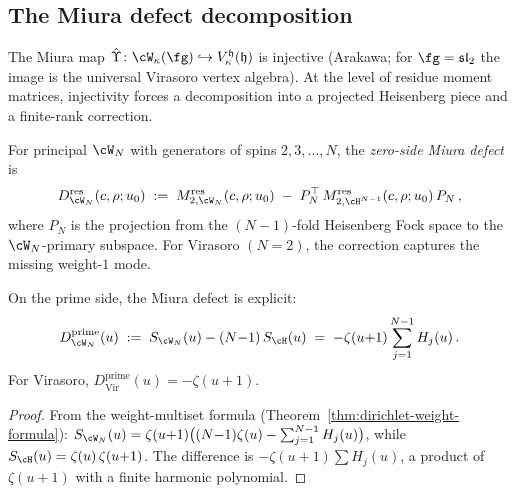 \subsection{The Miura defect decomposition}%
\label{sec:miura-defect-decomposition}%
%

The Miura map $\hat\Upsilon\colon \cW_\kappa(\fg) \hookrightarrow
V^{\mathfrak{h}}_\kappa(\mathfrak{h})$ is injective (Arakawa; for $\fg = \mathfrak{sl}_2$
the image is the universal Virasoro vertex algebra).
At the level of residue moment matrices, injectivity forces a
decomposition into a projected Heisenberg piece and a finite-rank
correction.

\begin{definition}%
\label{def:zero-side-miura-defect}%
%
For principal $\cW_N$ with generators of spins $2,3,\ldots,N$,
the \emph{zero-side Miura defect} is
\begin{equation}\label{eq:zero-side-miura-defect}
D_{\cW_N}^{\mathrm{res}}(c,\rho;u_0)
\;:=\;
M_{2,\cW_N}^{\mathrm{res}}(c,\rho;u_0)
\;-\;
P_N^\top\,
M_{2,\cH^{N-1}}^{\mathrm{res}}(c,\rho;u_0)\,
P_N\,,
\end{equation}
where $P_N$ is the projection from the $(N{-}1)$-fold
Heisenberg Fock space to the $\cW_N$-primary subspace.
For Virasoro $(N = 2)$, the correction captures the missing
weight-$1$ mode.
\end{definition}

\begin{proposition}[\ClaimStatusProvedHere]%
\label{prop:prime-side-defect-formula}%
%
On the prime side, the Miura defect is explicit\textup{:}
\begin{equation}\label{eq:prime-side-miura-defect}
D_{\cW_N}^{\mathrm{prime}}(u)
\;:=\;
S_{\cW_N}(u) - (N{-}1)\,S_\cH(u)
\;=\;
-\zeta(u{+}1)\sum_{j=1}^{N-1}H_j(u)\,.
\end{equation}
For Virasoro,
$D_{\mathrm{Vir}}^{\mathrm{prime}}(u) = -\zeta(u{+}1)$.
\end{proposition}

\begin{proof}
From the weight-multiset formula
(Theorem~\ref{thm:dirichlet-weight-formula}):
$S_{\cW_N}(u) = \zeta(u{+}1)\bigl((N{-}1)\zeta(u) -
\sum_{j=1}^{N-1}H_j(u)\bigr)$, while
$S_\cH(u) = \zeta(u)\,\zeta(u{+}1)$. The difference is
$-\zeta(u{+}1)\sum H_j(u)$, a product of $\zeta(u{+}1)$
with a finite harmonic polynomial.
\end{proof}

